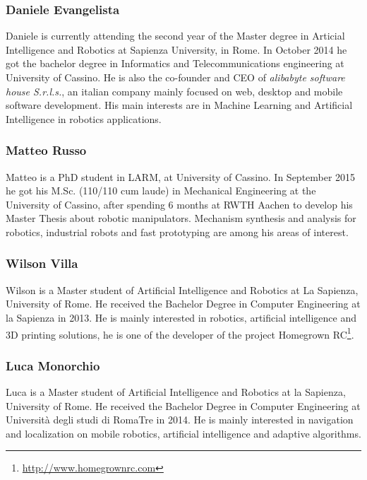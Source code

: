\documentclass{llncs}
\begin{document}
\subsubsection*{Daniele Evangelista}
Daniele is currently attending the second year of the Master degree in Articial Intelligence and Robotics at Sapienza University, in Rome. 
In October 2014 he got the bachelor degree in Informatics and Telecommunications engineering at University of Cassino. 
He is also the co-founder and CEO of \emph{alibabyte software house S.r.l.s.}, an italian company mainly focused on web, desktop and mobile 
software development. His main interests are in Machine Learning and Artificial Intelligence in robotics applications.


\subsubsection*{Matteo Russo}
Matteo is a PhD student in LARM, at University of Cassino. In September 2015 he got his M.Sc. (110/110 cum laude) in Mechanical Engineering 
at the University of Cassino, after spending 6 months at RWTH Aachen to develop his Master Thesis about robotic manipulators. 
Mechanism synthesis and analysis for robotics, industrial robots and fast prototyping are among his areas of interest.

\subsubsection*{Wilson Villa}
Wilson is a Master student of Artificial Intelligence and Robotics at La Sapienza, University of Rome. 
He received the Bachelor Degree in Computer Engineering at la Sapienza in 2013. 
He is mainly interested in robotics, artificial intelligence and 3D printing solutions, he is one of the developer of the project Homegrown RC\footnote{\url{http://www.homegrownrc.com}}.

\subsubsection*{Luca Monorchio}
Luca is a Master student of Artificial Intelligence and Robotics at la Sapienza, University of Rome. He received the Bachelor Degree in Computer Engineering at Università degli studi di RomaTre in 2014. He is mainly interested in navigation and localization on mobile robotics, artificial intelligence and adaptive algorithms.
\end{document}
